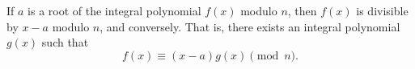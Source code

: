 If $a$ is a root of the integral polynomial $f(x)$ modulo $n$, then $f(x)$ is divisible by $x-a$ modulo $n$, and conversely. That is, there exists an integral polynomial $g(x)$ such that
$$f(x) \equiv (x-a)g(x) \pmod{n}.$$
